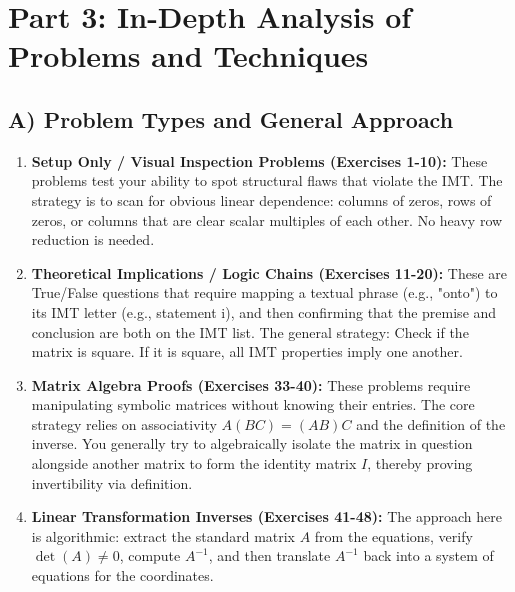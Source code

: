 \documentclass[12pt]{article}
\begin{document}
\section{Part 3: In-Depth Analysis of Problems and Techniques}

\subsection{A) Problem Types and General Approach}
\begin{enumerate}
    \item \textbf{Setup Only / Visual Inspection Problems (Exercises 1-10):}
    These problems test your ability to spot structural flaws that violate the IMT. The strategy is to scan for obvious linear dependence: columns of zeros, rows of zeros, or columns that are clear scalar multiples of each other. No heavy row reduction is needed.
    
    \item \textbf{Theoretical Implications / Logic Chains (Exercises 11-20):}
    These are True/False questions that require mapping a textual phrase (e.g., "onto") to its IMT letter (e.g., statement i), and then confirming that the premise and conclusion are both on the IMT list. The general strategy: Check if the matrix is square. If it is square, all IMT properties imply one another.
    
    \item \textbf{Matrix Algebra Proofs (Exercises 33-40):}
    These problems require manipulating symbolic matrices without knowing their entries. The core strategy relies on associativity $A(BC) = (AB)C$ and the definition of the inverse. You generally try to algebraically isolate the matrix in question alongside another matrix to form the identity matrix $I$, thereby proving invertibility via definition.

    \item \textbf{Linear Transformation Inverses (Exercises 41-48):}
    The approach here is algorithmic: extract the standard matrix $A$ from the equations, verify $\det(A) \neq 0$, compute $A^{-1}$, and then translate $A^{-1}$ back into a system of equations for the coordinates.
\end{enumerate}
\end{document}
